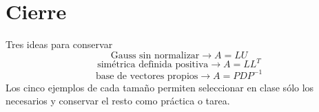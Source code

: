 \documentclass[aspectratio=169,10pt]{beamer}
\begin{document}
\section{Cierre}
\begin{frame}{Tres ideas para conservar}
\small
\[
\boxed{\text{Gauss sin normalizar}\longrightarrow A=LU}
\]
\[
\boxed{\text{simétrica definida positiva}\longrightarrow A=LL^T}
\]
\[
\boxed{\text{base de vectores propios}\longrightarrow A=PDP^{-1}}
\]
\medskip
Los cinco ejemplos de cada tamaño permiten seleccionar en clase sólo los necesarios y conservar el resto como práctica o tarea.
\end{frame}
\end{document}

